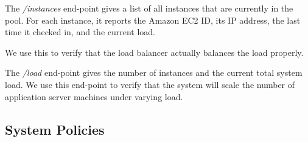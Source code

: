 			The \textit{/instances} end-point gives a list of all instances that are currently in the pool.
			For each instance, it reports the Amazon EC2 ID, its IP address, the last time it checked in, and the current load.
			
			We use this to verify that the load balancer actually balances the load properly.
			
			The \textit{/load} end-point gives the number of instances and the current total system load.
			We use this end-point to verify that the system will scale the number of application server machines under varying load.

\subsection{System Policies}
	